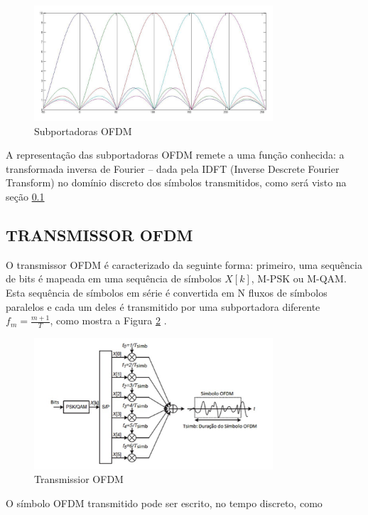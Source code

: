 \begin{figure}[h!]
\centering
\includegraphics[width=3.5in]{fig_OFDM_freq.png} %
\caption{Subportadoras OFDM}
\label{subportadorasOFDM}
\end{figure}

\par A representação das subportadoras OFDM remete a uma função conhecida: a transformada inversa de Fourier – dada pela IDFT (Inverse Descrete Fourier Transform) no domínio discreto dos símbolos transmitidos, como será visto na seção \ref{trans_OFDM}  

\subsection{TRANSMISSOR OFDM}\label{trans_OFDM}
\par O transmissor OFDM é caracterizado da seguinte forma: primeiro, uma sequência de bits é mapeada em uma sequência de símbolos $X[k]$, M-PSK ou M-QAM. Esta sequência de símbolos em série é convertida em N fluxos de símbolos paralelos e cada um deles é transmitido por uma subportadora diferente $f_{m} =  \frac{m+1}{T}$, como mostra a Figura \ref{trans1OFDM} \cite{tcc9}.

\begin{figure}[h!]
\centering
\includegraphics[width=3.5in]{trans_OFDM.png} %
\caption{Transmissior OFDM \cite{tcc9}}
\label{trans1OFDM}
\end{figure}

\par O símbolo OFDM transmitido pode ser escrito, no tempo discreto, como \cite{tcc9}

